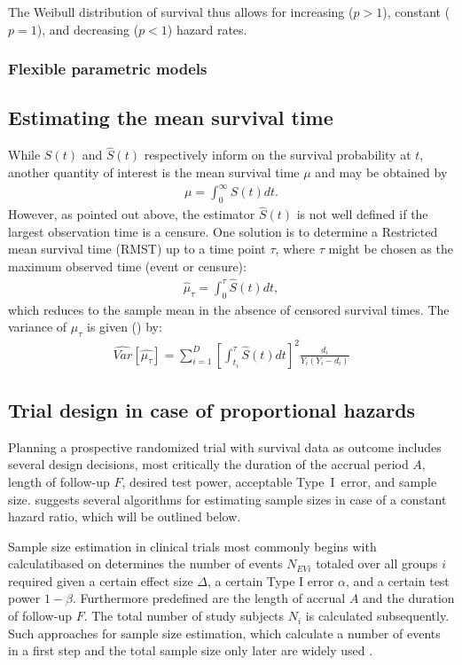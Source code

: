 \documentclass[main.tex]{subfiles}
\begin{document}
The Weibull distribution of survival thus allows for increasing ($p>1$), constant ($p=1$), and decreasing ($p<1$) hazard rates.
\subsubsection{Flexible parametric models}

\subsection{Estimating the mean survival time}
While $S(t)$ and $\hat{S}(t)$ respectively inform on the survival probability at $t$, another quantity of interest is the mean survival time $\mu$ and may be obtained by
\begin{align}
\mu = \int_0^{\infty}S(t)dt.
\end{align}
However, as pointed out above, the estimator $\hat{S}(t)$ is not well defined if the largest observation time is a censure. One solution is to determine a Restricted mean survival time (RMST) up to a time point $\tau$, where $\tau$ might be chosen as the maximum observed time (event or censure):
\begin{align}
\hat{\mu}_{\tau} = \int_0^{\tau}\hat{S}(t)dt,
\end{align}
which reduces to the sample mean in the absence of censored survival times.
The variance of $\mu_{\tau}$ is given (\parencite{klein2003survival}) by:
\begin{align}
\widehat{Var}[\hat{\mu_{\tau}}] = \sum_{i=1}^D\left[ \int_{t_i}^\tau \hat{S}(t)dt\right]^2 \frac{d_i}{Y_i(Y_i - d_i)}
\end{align}
\subsection{Trial design in case of proportional hazards} \label{chap:Trial_Design_PH}
Planning a prospective randomized trial with survival data as outcome includes several design decisions, most critically the duration of the accrual period $A$, length of follow-up $F$, desired test power, acceptable Type~I~error, and sample size. \textcite{kleinbaum2012survival} suggests several algorithms for estimating sample sizes in case of a constant hazard ratio, which will be outlined below.

Sample size estimation in clinical trials most commonly begins with calculatibased on \textcite{kleinbaum2012survival} determines the number of events $N_{EVi}$ totaled over all groups $i$ required given a certain effect size $\Delta$, a certain Type I error $\alpha$, and a certain test power $1-\beta$. Furthermore predefined are the length of accrual $A$ and the duration of follow-up $F$. The total number of study subjects $N_i$ is calculated subsequently. Such approaches for sample size estimation, which calculate a number of events in a first step and the total sample size only later are widely used \parencite{Yung2020-ht}.
\end{document}
